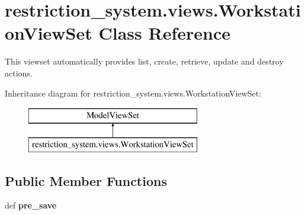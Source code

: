 \hypertarget{classrestriction__system_1_1views_1_1WorkstationViewSet}{}\section{restriction\+\_\+system.\+views.\+Workstation\+View\+Set Class Reference}
\label{classrestriction__system_1_1views_1_1WorkstationViewSet}


This viewset automatically provides {\ttfamily list}, {\ttfamily create}, {\ttfamily retrieve}, {\ttfamily update} and {\ttfamily destroy} actions.  


Inheritance diagram for restriction\+\_\+system.\+views.\+Workstation\+View\+Set\+:\begin{figure}[H]
\begin{center}
\leavevmode
\includegraphics[height=2.000000cm]{classrestriction__system_1_1views_1_1WorkstationViewSet}
\end{center}
\end{figure}
\subsection*{Public Member Functions}
\begin{DoxyCompactItemize}
\item 
\hypertarget{classrestriction__system_1_1views_1_1WorkstationViewSet_a7a35993729656f61c7de3575754fdb7e}{}def {\bfseries pre\+\_\+save}\label{classrestriction__system_1_1views_1_1WorkstationViewSet_a7a35993729656f61c7de3575754fdb7e}

\end{DoxyCompactItemize}
